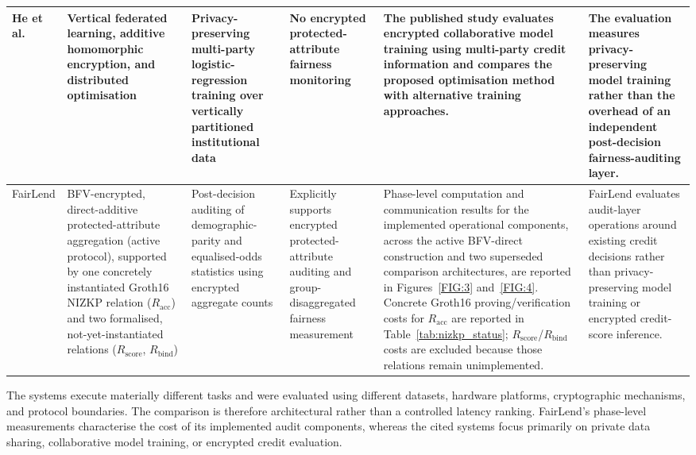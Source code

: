 \documentclass[a4paper,fleqn]{cas-dc}
\begin{document}
\begin{table}[htbp]
\begin{tabular}{
|p{1.8cm}
|p{2.5cm}
|p{2.5cm}
|p{2.3cm}
|p{3.2cm}
|p{2.8cm}|}
He et al.~\cite{he2023privacy}
&
Vertical federated learning, additive homomorphic encryption, and distributed
optimisation
&
Privacy-preserving multi-party logistic-regression training over vertically
partitioned institutional data
&
No encrypted protected-attribute fairness monitoring
&
The published study evaluates encrypted collaborative model training using
multi-party credit information and compares the proposed optimisation method
with alternative training approaches.
&
The evaluation measures privacy-preserving model training rather than the
overhead of an independent post-decision fairness-auditing layer.
\\
\hline

FairLend
&
BFV-encrypted, direct-additive protected-attribute aggregation (active
protocol), supported by one concretely instantiated Groth16 NIZKP relation
($R_{\mathrm{acc}}$) and two formalised, not-yet-instantiated relations
($R_{\mathrm{score}}$, $R_{\mathrm{bind}}$)
&
Post-decision auditing of demographic-parity and equalised-odds statistics
using encrypted aggregate counts
&
Explicitly supports encrypted protected-attribute auditing and
group-disaggregated fairness measurement
&
Phase-level computation and communication results for the implemented
operational components, across the active BFV-direct construction and two
superseded comparison architectures, are reported in
Figures~\ref{FIG:3} and~\ref{FIG:4}. Concrete Groth16 proving/verification
costs for $R_{\mathrm{acc}}$ are reported in Table~\ref{tab:nizkp_status};
$R_{\mathrm{score}}$/$R_{\mathrm{bind}}$ costs are excluded because those
relations remain unimplemented.
&
FairLend evaluates audit-layer operations around existing credit decisions
rather than privacy-preserving model training or encrypted credit-score
inference.
\\
\hline

\end{tabular}
\end{table}



The systems execute materially different tasks and were evaluated using different datasets, hardware platforms, cryptographic mechanisms, and protocol boundaries. The comparison is therefore architectural rather than a controlled latency ranking. FairLend's phase-level measurements characterise the cost of its implemented audit components, whereas the cited systems focus primarily on private data sharing, collaborative model training, or encrypted credit evaluation.
\end{document}
